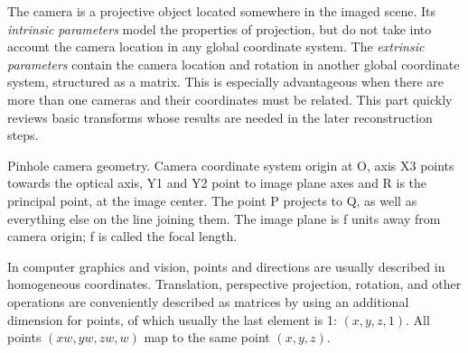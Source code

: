 
The camera is a projective object located somewhere in the imaged scene.
Its \textit{intrinsic parameters} model the properties of projection, but do not take into account the camera location in any global coordinate system.
The \textit{extrinsic parameters} contain the camera location and rotation in another global coordinate system, structured as a matrix.
This is especially advantageous when there are more than one cameras and their coordinates must be related.
\cite{hartley03multiview,heyden2005multiple}
This part quickly reviews basic transforms whose results are needed in the later reconstruction steps.


{Pinhole camera geometry. Camera coordinate system origin at O, axis X3 points towards the optical axis, Y1 and Y2 point to image plane axes and R is the principal point, at the image center. The point P projects to Q, as well as everything else on the line joining them. The image plane is f units away from camera origin; f is called the focal length.}

In computer graphics and vision, points and directions are usually described in homogeneous coordinates.
Translation, perspective projection, rotation, and other operations are conveniently described as matrices by using an additional dimension for points, of which usually the last element is 1: $(x, y, z, 1)$.
All points $(xw, yw, zw, w)$ map to the same point $(x, y, z)$.
\cite{dubrofsky2009homography,hartley03multiview}

